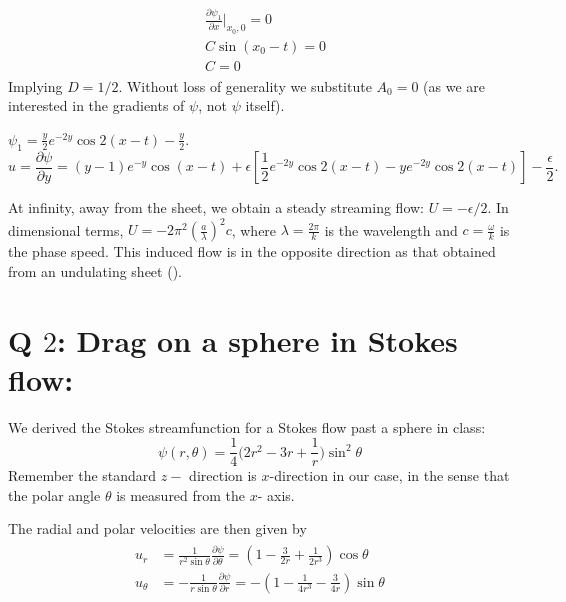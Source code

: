 \documentclass{article}
\begin{document}
\begin{align}
 \begin{split}
  &\frac{\partial \psi_{1}}{\partial x }\bigg|_{x_{0}, 0} = 0\\
  & C \sin{(x_{0} - t)} = 0\\
  & \boxed{C = 0}
 \end{split}
\end{align}
Implying $\boxed{D = 1/2}$. Without loss of generality we substitute $A_{0}=0$ (as we are interested in the gradients of $\psi$, not $\psi$ itself).

$\boxed{\psi_{1} = \frac{y}{2}e^{-2y}\cos{2(x-t)} - \frac{y}{2} }.$
$$u = \frac{\partial \psi}{\partial y} = (y-1)e^{-y} \cos{(x-t)} + \epsilon\left[ \frac{1}{2}e^{-2y} \cos{2(x-t)} - y e^{-2y}\cos{2(x-t)}\right] - \frac{\epsilon}{2}.$$

At infinity, away from the sheet, we obtain a steady streaming flow:
$\boxed{U = -\epsilon/2}$. In dimensional terms, $\boxed{U = -2\pi^{2}\left(\frac{a}{\lambda}\right)^{2}{c}}$, where $\lambda = \frac{2\pi}{k}$ is the wavelength and $c = \frac{\omega}{k}$ is the phase speed. This induced flow is in the opposite direction as that obtained from an undulating sheet (\cite{acheson1991elementary}). 

\section{Q $2$: Drag on a sphere in Stokes flow: }
We derived the Stokes streamfunction for a Stokes flow past a sphere in class:
\begin{equation}\label{eq:stokes_streamfn}
 \psi(r, \theta) = \frac{1}{4}\bigg(2r^{2}-3r+\frac{1}{r}\bigg)\sin^{2}{\theta}
\end{equation}
Remember the standard $z-$ direction is $x$-direction in our case, in the sense that the polar angle $\theta$ is measured from the $x$- axis. 

The radial and polar velocities are then given by
\begin{align}\label{eq:velo_fields}
 \begin{split}
  u_{r} & = \frac{1}{r^{2}\sin{\theta}}\frac{\partial \psi}{\partial \theta} = \left( 1 - \frac{3}{2r} + \frac{1}{2r^{3}}\right)\cos{\theta}\\
  u_{\theta} &= -\frac{1}{r\sin{\theta}}\frac{\partial \psi}{\partial r} = -\left(1 - \frac{1}{4r^{3}} -\frac{3}{4r} \right)\sin{\theta}
 \end{split}
\end{align}
\end{document}
